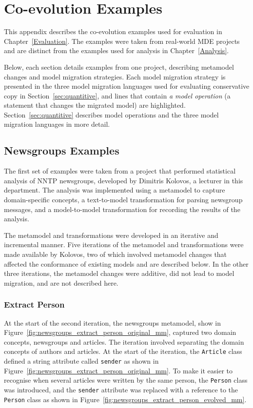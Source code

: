 \chapter{Co-evolution Examples}
\label{CoevolutionExamples}




This appendix describes the co-evolution examples used for evaluation in Chapter~\ref{Evaluation}. The examples were taken from real-world MDE projects and are distinct from the examples used for analysis in Chapter~\ref{Analysis}.

Below, each section details examples from one project, describing metamodel changes and model migration strategies. Each model migration strategy is presented in the three model migration languages used for evaluating conservative copy in Section~\ref{sec:quantitive}, and lines that contain \emph{a model operation} (a statement that changes the migrated model) are highlighted. Section~\ref{sec:quantitive} describes model operations and the three model migration languages in more detail.


\section{Newsgroups Examples}
The first set of examples were taken from a project that performed statistical analysis of NNTP newsgroups, developed by Dimitris Kolovos, a lecturer in this department. The analysis was implemented using a metamodel to capture domain-specific concepts, a text-to-model transformation for parsing newsgroup messages, and a model-to-model transformation for recording the results of the analysis.

The metamodel and transformations were developed in an iterative and incremental manner. Five iterations of the metamodel and transformations were made available by Kolovos, two of which involved metamodel changes that affected the conformance of existing models and are described below. In the other three iterations, the metamodel changes were additive, did not lead to model migration, and are not described here.

\subsection{Extract Person}
At the start of the second iteration, the newsgroups metamodel, show in Figure~\ref{fig:newsgroups_extract_person_original_mm}, captured two domain concepts, newsgroups and articles. The iteration involved separating the domain concepts of authors and articles. At the start of the iteration, the \texttt{Ar\-ti\-c\-le} class defined a string attribute called \texttt{se\-nd\-er} as shown in Figure~\ref{fig:newsgroups_extract_person_original_mm}. To make it easier to recognise when several articles were written by the same person, the \texttt{Pe\-rs\-on} class was introduced, and the \texttt{se\-nd\-er} attribute was replaced with a reference to the \texttt{Pe\-rs\-on} class as shown in Figure~\ref{fig:newsgroups_extract_person_evolved_mm}.


